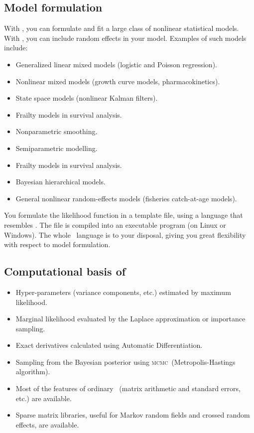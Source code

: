 \documentclass{admbmanual}
\newcommand{\scMCMC}{\textsc{mcmc}}
\begin{document}
\subsection{Model formulation}

With \scAB, you can formulate and fit a large class of nonlinear statistical
models. With \scAR, you can include random effects in your model. Examples of
such models include:
\begin{itemize}
\item Generalized linear mixed models (logistic and Poisson regression).
\item Nonlinear mixed models (growth curve models, pharmacokinetics).
\item State space models (nonlinear Kalman filters).
\item Frailty models in survival analysis.
\item Nonparametric smoothing.
\item Semiparametric modelling.
\item Frailty models in survival analysis.
\item Bayesian hierarchical models.
\item General nonlinear random-effects models (fisheries catch-at-age
models).
\end{itemize}
You formulate the likelihood function in a template file, using a language that
resembles \cplus. The file is compiled into an executable program (on Linux or
Windows). The whole \cplus\ language is to your disposal, giving you great
flexibility with respect to model formulation.

\subsection{Computational basis of \scAR}

\begin{itemize}
  \item Hyper-parameters (variance components, etc.) estimated by maximum
  likelihood.

  \item Marginal likelihood evaluated by the Laplace approximation or importance
  sampling.

  \item Exact derivatives calculated using Automatic Differentiation.

  \item Sampling from the Bayesian posterior using \scMCMC\ (Metropolis-Hastings
  algorithm).

  \item Most of the features of ordinary \scAB\ (matrix arithmetic and standard
  errors, etc.) are available.

  \item Sparse matrix libraries, useful for Markov random fields and crossed
  random effects, are available.
\end{itemize}
\end{document}
